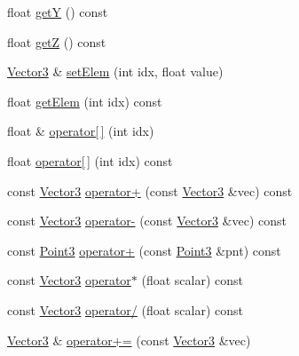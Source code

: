 \begin{DoxyCompactItemize}
\item 
float \hyperlink{classVectormath_1_1Aos_1_1Vector3_acd7624ab467b59e1e6bc07068e62a7f8}{get\-Y} () const 
\item 
float \hyperlink{classVectormath_1_1Aos_1_1Vector3_a9e0cab50c1abecb8d391072500d23ab7}{get\-Z} () const 
\item 
\hyperlink{classVectormath_1_1Aos_1_1Vector3}{Vector3} \& \hyperlink{classVectormath_1_1Aos_1_1Vector3_a74793bcd127eae5b275fe28fd958c025}{set\-Elem} (int idx, float value)
\item 
float \hyperlink{classVectormath_1_1Aos_1_1Vector3_a6e8f0e60f217a9213b80a6f88db2a3ea}{get\-Elem} (int idx) const 
\item 
float \& \hyperlink{classVectormath_1_1Aos_1_1Vector3_a971ce4bddfa3f1f7f5de5d9ef3539934}{operator\mbox{[}$\,$\mbox{]}} (int idx)
\item 
float \hyperlink{classVectormath_1_1Aos_1_1Vector3_a461c40f88ef7800ae5abf2abf557eb13}{operator\mbox{[}$\,$\mbox{]}} (int idx) const 
\item 
const \hyperlink{classVectormath_1_1Aos_1_1Vector3}{Vector3} \hyperlink{classVectormath_1_1Aos_1_1Vector3_a49dea4fda839717de531285447650954}{operator+} (const \hyperlink{classVectormath_1_1Aos_1_1Vector3}{Vector3} \&vec) const 
\item 
const \hyperlink{classVectormath_1_1Aos_1_1Vector3}{Vector3} \hyperlink{classVectormath_1_1Aos_1_1Vector3_a8a0c415068c63b62ab3df0b41e008884}{operator-\/} (const \hyperlink{classVectormath_1_1Aos_1_1Vector3}{Vector3} \&vec) const 
\item 
const \hyperlink{classVectormath_1_1Aos_1_1Point3}{Point3} \hyperlink{classVectormath_1_1Aos_1_1Vector3_a7f955fe9378ec4a1c976eca103b9a2e2}{operator+} (const \hyperlink{classVectormath_1_1Aos_1_1Point3}{Point3} \&pnt) const 
\item 
const \hyperlink{classVectormath_1_1Aos_1_1Vector3}{Vector3} \hyperlink{classVectormath_1_1Aos_1_1Vector3_a77b8f932fff0680937d3c813c41d7833}{operator$\ast$} (float scalar) const 
\item 
const \hyperlink{classVectormath_1_1Aos_1_1Vector3}{Vector3} \hyperlink{classVectormath_1_1Aos_1_1Vector3_a31205ac01165fcee346102f6aa2d5092}{operator/} (float scalar) const 
\item 
\hyperlink{classVectormath_1_1Aos_1_1Vector3}{Vector3} \& \hyperlink{classVectormath_1_1Aos_1_1Vector3_a96398652a42f4967b3beab53e09d0171}{operator+=} (const \hyperlink{classVectormath_1_1Aos_1_1Vector3}{Vector3} \&vec)
\item 

\end{DoxyCompactItemize}
